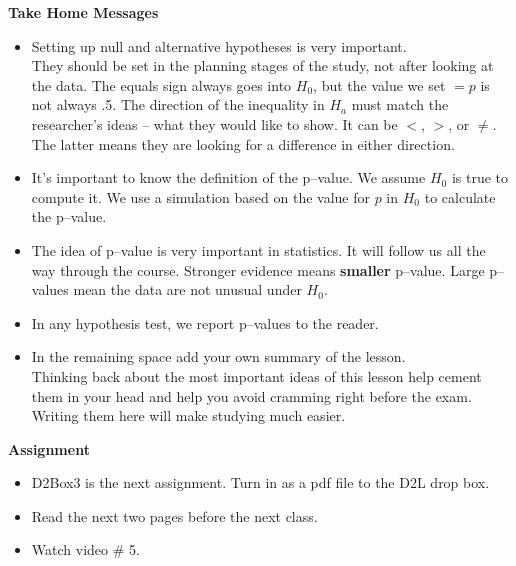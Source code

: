 {\bf Take Home Messages}
\begin{itemize}
  \item Setting up null and alternative hypotheses is very
    important.\\
    They should be set in the planning stages of the study, not after
    looking at the data. 
    The equals sign always goes into $H_0$, but the value we set $ = p$ is not
    always .5.  The direction of the inequality in $H_a$ must match
    the researcher's ideas -- what they would like to show. It can be
    $<$, $>$, or $\neq$.  The latter means they are looking for a
    difference in either direction.
  \item It's important to know the definition of the p--value. We
    assume $H_0$ is true to compute it.  We  use a simulation based
    on the  value for $p$  in $H_0$ to calculate the p--value.    
  \item The idea of p--value is very important in statistics. It will
    follow us all the way through the course. Stronger evidence means
    {\bf smaller} p--value.  Large p--values mean the data are not
    unusual under $H_0$.
  \item In any hypothesis test, we report p--values to the reader.  
 \item 
  In the remaining space add your own summary of the lesson. \\
  Thinking back about the most important ideas of this lesson help
  cement them in your head and help you avoid cramming right before
  the exam.  Writing them here will make studying much easier.   
\end{itemize}\vfill

{\bf Assignment}
\begin{itemize}
\item  D2Box3 is the next assignment.  Turn in as a pdf file to the D2L
  drop box.
\item Read the next two pages before the next class.
\item Watch video \# 5.
\end{itemize}




